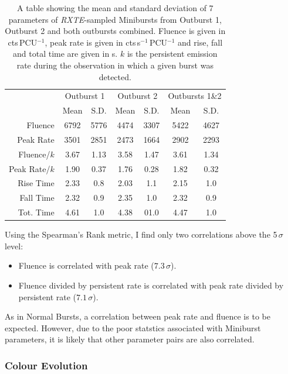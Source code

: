 \begin{table}
\centering
\begin{tabular}{r c c c c c c}
\hline
\hline
 & \multicolumn{2}{c}{\scriptsize Outburst 1} & \multicolumn{2}{c}{\scriptsize Outburst 2} & \multicolumn{2}{c}{\scriptsize Outbursts 1\&2}  \\
 &Mean&S.D.&Mean&S.D.&Mean&S.D.\\
\hline
\scriptsize Fluence&6792&5776&4474&3307&5422&4627\\
\scriptsize Peak Rate&3501&2851&2473&1664&2902&2293\\
\scriptsize Fluence/$k$&3.67&1.13&3.58&1.47&3.61&1.34\\
\scriptsize Peak Rate/$k$&1.90&0.37&1.76&0.28&1.82&0.32\\
\scriptsize Rise Time&2.33&0.8&2.03&1.1&2.15&1.0\\
\scriptsize Fall Time&2.32&0.9&2.35&1.0&2.32&0.9\\
\scriptsize Tot. Time&4.61&1.0&4.38&01.0&4.47&1.0\\
\hline
\hline
\end{tabular}
\caption[A table showing the mean and standard deviation of 7 parameters of \textit{RXTE}-sampled Minibursts from Outburst 1, Outburst 2 and both outbursts combined.]{A table showing the mean and standard deviation of 7 parameters of \textit{RXTE}-sampled Minibursts from Outburst 1, Outburst 2 and both outbursts combined.  Fluence is given in cts\,PCU$^{-1}$, peak rate is given in cts\,s$^{-1}$\,PCU$^{-1}$ and rise, fall and total time are given in s.  $k$ is the persistent emission rate during the observation in which a given burst was detected.}
\label{tab:mini_param}
\end{table}

\par Using the Spearman's Rank metric, I find only two correlations above the 5$\,\sigma$ level:
\begin{itemize}
\item Fluence is correlated with peak rate ($7.3\,\sigma$).
\item Fluence divided by persistent rate is correlated with peak rate divided by persistent rate ($7.1\,\sigma$).
\end{itemize}
As in Normal Bursts, a correlation between peak rate and fluence is to be expected.  However, due to the poor statstics associated with Miniburst parameters, it is likely that other parameter pairs are also correlated.

\subsubsection{Colour Evolution}

